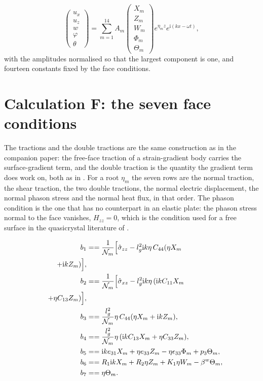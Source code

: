 \documentclass[11pt]{article}
\makeatletter
\newif\ifshowworked
\newenvironment{worked}{%
  \ifshowworked\par\smallskip\noindent\textit{Working.}\par\smallskip\else
  \setbox\z@\vbox\bgroup\fi}{\ifshowworked\par\smallskip\else\egroup\fi}
\newcommand{\ii}{\mathrm{i}}
\newcommand{\Ncal}{\mathcal{N}}
\makeatother
\begin{document}
\begin{equation}
\begin{pmatrix}u_x\\u_z\\w\\\varphi\\\theta\end{pmatrix}
=\sum_{m=1}^{14}A_m
\begin{pmatrix}X_m\\Z_m\\W_m\\\Phi_m\\\Theta_m\end{pmatrix}
e^{\eta_m z}e^{\ii(kx-\omega t)} ,
\end{equation}
with the amplitudes normalised so that the largest component is one, and fourteen constants fixed by the
face conditions.

\section{Calculation F: the seven face conditions}\label{sec:calcF}

\begin{worked}
The tractions and the double tractions are the same construction as in the companion paper: the free-face
traction of a strain-gradient body carries the surface-gradient term, and the double traction is the
quantity the gradient term does work on, both as in \cite[Sec.~2, Eq.~(14)]{Charal2019}.
For a root $\eta_m$ the seven rows are the normal traction, the shear traction, the two double tractions,
the normal electric displacement, the normal phason stress and the normal heat flux, in that order.
The phason condition is the one that has no counterpart in an elastic plate: the phason stress normal to
the face vanishes, $H_{zz}=0$, which is the condition used for a free surface in the quasicrystal
literature of \cite{Zhang2021}.
\end{worked}

\begin{align}
b_1&==\frac{1}{\Ncal_m}\Bigl[\hat\sigma_{zz}-l_g^2\ii k\eta\,C_{44}(\eta X_m \\
\quad +\ii kZ_m)\Bigr], \\
b_2&==\frac{1}{\Ncal_m}\Bigl[\hat\sigma_{xz}-l_g^2\ii k\eta\,(\ii kC_{11}X_m \\
\quad +\eta C_{13}Z_m)\Bigr], \\
b_3&==\frac{l_g^2}{\Ncal_m}\eta\,C_{44}(\eta X_m+\ii kZ_m), \\
b_4&==\frac{l_g^2}{\Ncal_m}\eta\,(\ii kC_{13}X_m+\eta C_{33}Z_m), \\
b_5&==\ii ke_{31}X_m+\eta e_{33}Z_m-\eta\epsilon_{33}\Phi_m+p_3\Theta_m, \\
b_6&==R_1\ii kX_m+R_2\eta Z_m+K_1\eta W_m-\beta^{w}\Theta_m, \\
b_7&==\eta\Theta_m .
\end{align}
\end{document}
